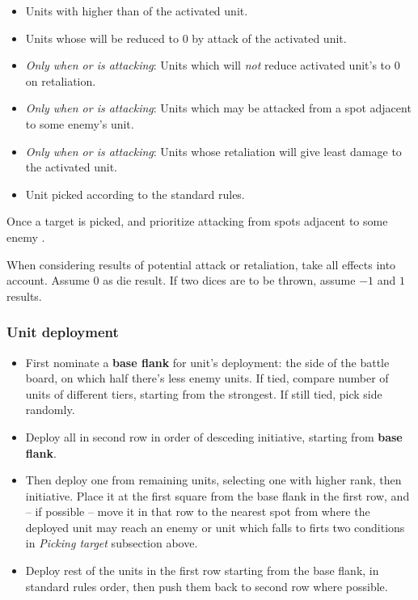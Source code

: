 \begin{multicols*}{2}
    
    \begin{itemize}
        \item Units with  higher than  of the activated unit.
        \item Units whose  will be reduced to $0$ by attack of the activated unit.
        \item \textit{Only when  or  is attacking}: Units which will \emph{not} reduce activated unit's  to $0$ on retaliation.
        \item \textit{Only when  or  is attacking}: Units which may be attacked from a spot adjacent to some enemy's  unit.
        \item \textit{Only when  or  is attacking}: Units whose retaliation will give least damage to the activated unit.
        \item Unit picked according to the standard rules.
    \end{itemize}
    
    Once a target is picked,  and  prioritize attacking from spots adjacent to some enemy .
   
    When considering results of potential attack or retaliation, take all effects into account.  Assume $0$ as die result. If two dices are to be thrown, assume $-1$ and $1$ results.
    
    \subsubsection*{Unit deployment}
    
    \begin{itemize}
        \item First nominate a \textbf{base flank} for unit's deployment: the side of the battle board, on which half there's less enemy units. If tied, compare number of units of different tiers, starting from the strongest. If still tied, pick side randomly.
        \item Deploy all  in second row in order of desceding initiative, starting from \textbf{base flank}.
        \item Then deploy one from remaining units, selecting one with higher rank, then initiative. Place it at the first square from the base flank in the first row, and -- if possible -- move it in that row to the nearest spot from where the deployed unit may reach an enemy  or unit which falls to firts two conditions in \textit{Picking target} subsection above.
        \item Deploy rest of the units in the first row starting from the base flank, in standard rules order, then push them back to second row where possible.
    \end{itemize}
    

\end{multicols*}

